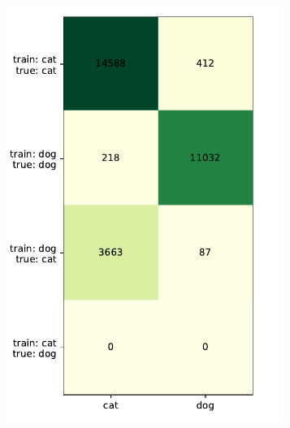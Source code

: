 \documentclass[a4paper,11pt]{scrartcl}
\theoremstyle{definition}
\begin{document}
\begin{figure}[!h]
\begin{subfigure}[t]{0.32\textwidth}
\includegraphics[width=0.99\textwidth]{Plots_1/compound_3000_25_00_no_Title.pdf}
\label{subfig:confusion_25_00}
\end{subfigure}
\begin{subfigure}[t]{0.32\textwidth}

\end{subfigure}
\end{figure}
\end{document}
